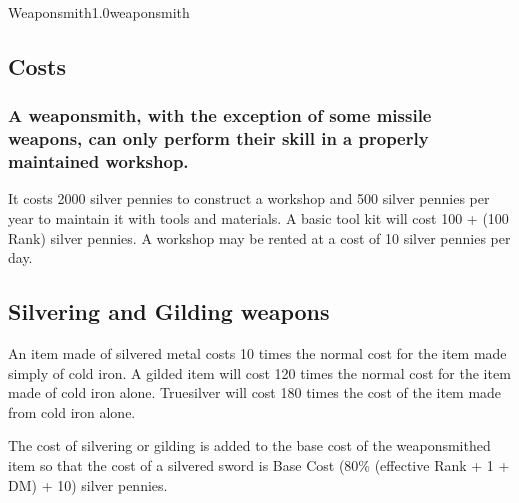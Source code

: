 \begin{skill}{Weaponsmith}{1.0}{weaponsmith}
\subsection{Costs}

\subsubsection{A weaponsmith, with the exception of some missile
weapons, can only perform their skill in a properly maintained
workshop.}

It costs 2000 silver pennies to construct a workshop and 500 silver
pennies per year to maintain it with tools and materials.  A basic
tool kit will cost 100 + (100 \x Rank) silver pennies.  A workshop may
be rented at a cost of 10 silver pennies per day.

\subsection{Silvering and Gilding weapons}

An item made of silvered metal costs 10 times the normal cost for the
item made simply of cold iron.  A gilded item will cost 120 times the
normal cost for the item made of cold iron alone.  Truesilver will
cost 180 times the cost of the item made from cold iron alone.

The cost of silvering or gilding is added to the base cost of the
weaponsmithed item so that the cost of a silvered sword is Base Cost
\x (80\% \x (effective Rank + 1 + DM) + 10) silver pennies.

\end{skill}
